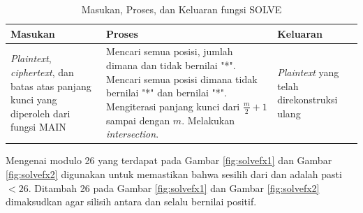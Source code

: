   \begin{table}[H]
	 	\caption{Masukan, Proses, dan Keluaran fungsi SOLVE}
		\begin{tabular}   {|p{2cm}|p{4.5cm}|p{2.5cm}|}\hline
		Masukan&Proses&Keluaran \\ \hline
		\textit{Plaintext}, \textit{ciphertext}, dan batas atas panjang kunci yang diperoleh dari fungsi MAIN&Mencari semua posisi, jumlah dimana \plaintext dan \ciphertext tidak bernilai "*". Mencari semua posisi dimana \ciphertext tidak bernilai "*" dan \plaintext bernilai "*". Mengiterasi panjang kunci dari $\frac{m}{2}+1$ sampai dengan $m$. Melakukan \textit{intersection}.  &\textit{Plaintext} yang telah direkonstruksi ulang \\ \hline
		\end{tabular}%
		\label{tab:iosolve}
	\end{table}

	Mengenai modulo 26 yang terdapat pada Gambar \ref{fig:solvefx1} dan Gambar \ref{fig:solvefx2} digunakan untuk memastikan bahwa sesilih dari \plaintext dan \ciphertext adalah pasti $< 26$. Ditambah 26 pada Gambar \ref{fig:solvefx1} dan Gambar \ref{fig:solvefx2} dimaksudkan agar silisih antara \plaintext dan \ciphertext selalu bernilai positif.  
  
